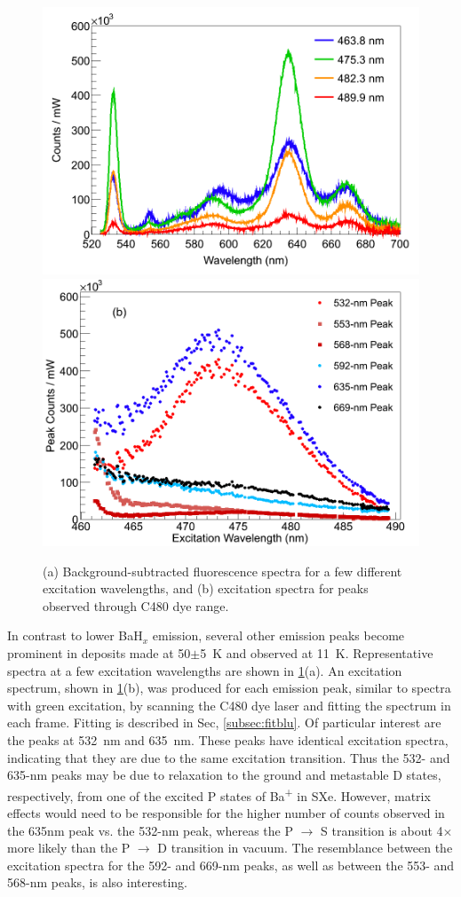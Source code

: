 \begin{figure} %
        \centering
                \includegraphics[width=.7\textwidth]{figures/excitspec_blu_a.png}
                \includegraphics[width=.7\textwidth]{figures/excitspecBlue_b.png}
                \caption{(a) Background-subtracted fluorescence spectra for a few different excitation wavelengths, and (b) excitation spectra for peaks observed through C480 dye range.}
\label{fig:excitspecBlue}
\end{figure}

In contrast to lower BaH$_{x}$ emission, several other emission peaks become prominent in deposits made at 50$\pm$5~K and observed at 11~K.  Representative spectra at a few excitation wavelengths are shown in \ref{fig:excitspecBlue}(a).  An excitation spectrum, shown in \ref{fig:excitspecBlue}(b), was produced for each emission peak, similar to spectra with green excitation, by scanning the C480 dye laser and fitting the spectrum in each frame.  Fitting is described in Sec, \ref{subsec:fitblu}.  Of particular interest are the peaks at 532~nm and 635~nm.  These peaks have identical excitation spectra, indicating that they are due to the same excitation transition.  Thus the 532- and 635-nm peaks may be due to relaxation to the ground and metastable D states, respectively, from one of the excited P states of Ba\textsuperscript{+} in SXe.  However, matrix effects would need to be responsible for the higher number of counts observed in the 635nm peak vs. the 532-nm peak, whereas the P $\rightarrow$ S transition is about 4$\times$ more likely than the P $\rightarrow$ D transition in vacuum.  The resemblance between the excitation spectra for the 592- and 669-nm peaks, as well as between the 553- and 568-nm peaks, is also interesting.  


